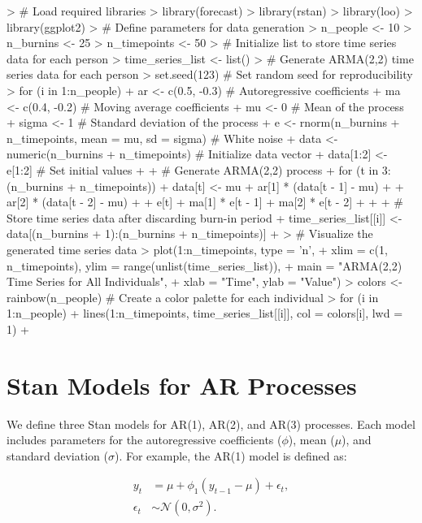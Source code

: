 \documentclass{article}
\begin{document}
\begin{Schunk}
\begin{Sinput}
> # Load required libraries
> library(forecast)
> library(rstan)
> library(loo)
> library(ggplot2)
> # Define parameters for data generation
> n_people <- 10
> n_burnins <- 25
> n_timepoints <- 50
> # Initialize list to store time series data for each person
> time_series_list <- list()
> # Generate ARMA(2,2) time series data for each person
> set.seed(123)  # Set random seed for reproducibility
> for (i in 1:n_people) {
+   ar <- c(0.5, -0.3)  # Autoregressive coefficients
+   ma <- c(0.4, -0.2)  # Moving average coefficients
+   mu <- 0             # Mean of the process
+   sigma <- 1          # Standard deviation of the process
+   e <- rnorm(n_burnins + n_timepoints, mean = mu, sd = sigma) # White noise
+   data <- numeric(n_burnins + n_timepoints) # Initialize data vector
+   data[1:2] <- e[1:2]                        # Set initial values
+   
+   # Generate ARMA(2,2) process
+   for (t in 3:(n_burnins + n_timepoints)) {
+     data[t] <- mu + ar[1] * (data[t - 1] - mu) + 
+       ar[2] * (data[t - 2] - mu) + 
+       e[t] + ma[1] * e[t - 1] + ma[2] * e[t - 2] 
+   }
+   
+   # Store time series data after discarding burn-in period
+   time_series_list[[i]] <- data[(n_burnins + 1):(n_burnins + n_timepoints)]
+ }
> # Visualize the generated time series data
> plot(1:n_timepoints, type = 'n', 
+      xlim = c(1, n_timepoints), ylim = range(unlist(time_series_list)), 
+      main = "ARMA(2,2) Time Series for All Individuals", 
+      xlab = "Time", ylab = "Value")
> colors <- rainbow(n_people)  # Create a color palette for each individual
> for (i in 1:n_people) {
+   lines(1:n_timepoints, time_series_list[[i]], col = colors[i], lwd = 1)
+ }
\end{Sinput}
\end{Schunk}

\section{Stan Models for AR Processes}

We define three Stan models for AR(1), AR(2), and AR(3) processes. Each model includes parameters for the autoregressive coefficients ($\phi$), mean ($\mu$), and standard deviation ($\sigma$). For example, the AR(1) model is defined as:

\begin{align}
  y_t &= \mu + \phi_1 (y_{t-1} - \mu) + \epsilon_t, \\
  \epsilon_t &\sim \mathcal{N}(0, \sigma^2).
\end{align}
\end{document}
